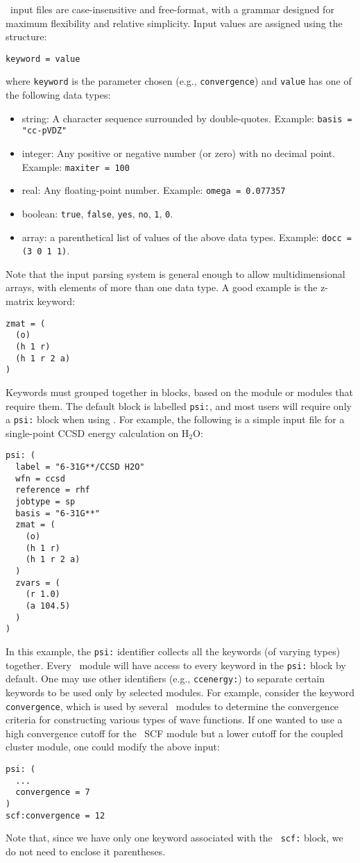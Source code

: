 \PSIthree\ input files are case-insensitive and free-format, with
a grammar designed for maximum flexibility and relative simplicity.
Input values are assigned using the structure:
\begin{verbatim}
keyword = value
\end{verbatim}
where {\tt keyword} is the parameter chosen (e.g., {\tt convergence})
and {\tt value} has one of the following data types:
\begin{itemize}
\item string: A character sequence surrounded by double-quotes.
  Example: {\tt basis = "cc-pVDZ"}
\item integer: Any positive or negative number (or zero) with no
  decimal point.  Example: {\tt maxiter = 100}
\item real: Any floating-point number.  Example: {\tt omega = 0.077357}
\item boolean: {\tt true}, {\tt false}, {\tt yes}, {\tt no}, {\tt 1},
  {\tt 0}.
\item array: a parenthetical list of values of the above data types.
  Example: {\tt docc = (3 0 1 1)}.  
\end{itemize}
Note that the input parsing system is general enough to allow
multidimensional arrays, with elements of more than one data type.  A
good example is the z-matrix keyword:
\begin{verbatim}
zmat = (
  (o)
  (h 1 r)
  (h 1 r 2 a)
)
\end{verbatim}

Keywords must grouped together in blocks, based on the module or
modules that require them.  The default block is labelled {\tt psi:},
and most users will require only a {\tt psi:} block when using
\PSIthree.  For example, the following is a simple input file for a
single-point CCSD energy calculation on H$_2$O:
\begin{verbatim}
psi: (
  label = "6-31G**/CCSD H2O"
  wfn = ccsd
  reference = rhf
  jobtype = sp
  basis = "6-31G**"
  zmat = (
    (o)
    (h 1 r)
    (h 1 r 2 a)
  )
  zvars = (
    (r 1.0)
    (a 104.5)
  )
)
\end{verbatim}
In this example, the {\tt psi:} identifier collects all the keywords
(of varying types) together.  Every \PSIthree\ module will have access
to every keyword in the {\tt psi:} block by default.  One may use
other identifiers (e.g., {\tt ccenergy:}) to separate certain keywords
to be used only by selected modules.  For example, consider the
keyword {\tt convergence}, which is used by several \PSIthree\ modules
to determine the convergence criteria for constructing various types
of wave functions.  If one wanted to use a high convergence cutoff for the
\PSIthree\ SCF module but a lower cutoff for the coupled cluster
module, one could modify the above input:
\begin{verbatim}
psi: (
  ...
  convergence = 7
)
scf:convergence = 12
\end{verbatim}
Note that, since we have only one keyword associated with the {\tt
  scf:} block, we do not need to enclose it parentheses.

